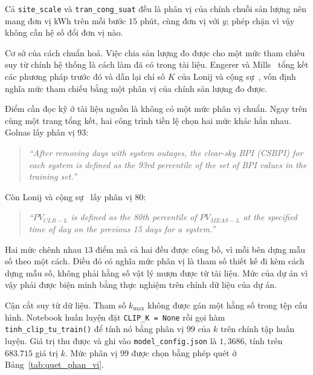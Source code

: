 \documentclass[12pt, a4paper]{report}
\begin{document}
Cả \texttt{site\_scale} và \texttt{tran\_cong\_suat} đều là phân vị của chính chuỗi sản lượng nên
mang đơn vị kWh trên mỗi bước $15$ phút, cùng đơn vị với $y$; phép chặn vì vậy không cần hệ số
đổi đơn vị nào.

Cơ sở của cách chuẩn hoá. Việc chia sản lượng đo được cho một mức tham chiếu suy từ
chính hệ thống là cách làm đã có trong tài liệu. Engerer và Mills~\cite{engerer2014kpv} tổng
kết các phương pháp trước đó và dẫn lại chỉ số $K$ của Lonij và cộng sự~\cite{lonij2012tucson},
vốn định nghĩa mức tham chiếu bằng một phân vị của chính sản lượng đo được.

Điểm cần đọc kỹ ở tài liệu nguồn là không có một mức phân vị chuẩn. Ngay trên cùng
một trang tổng kết, hai công trình tiền lệ chọn hai mức khác hẳn nhau. Golnas lấy
phân vị $93$:

\begin{quote}\small
\textit{``After removing days with system outages, the clear-sky BPI (CSBPI) for each system is defined as the 93rd percentile of the set of BPI values in the training set.''}
\end{quote}

Còn Lonij và cộng sự~\cite{lonij2012tucson} lấy phân vị $80$:

\begin{quote}\small
\textit{``$PV_{CLR-L}$ is defined as the 80th percentile of $PV_{MEAS-L}$ at the specified time of day on the previous 15 days for a system.''}
\end{quote}


Hai mức chênh nhau $13$ điểm mà cả hai đều được công bố, vì mỗi bên dựng mẫu số theo một cách.
Điều đó có nghĩa mức phân vị là tham số thiết kế đi kèm cách dựng mẫu số, không phải
hằng số vật lý mượn được từ tài liệu. Mức của dự án vì vậy phải được biện minh bằng thực
nghiệm trên chính dữ liệu của dự án.

Cận cắt suy từ dữ liệu. Tham số $k_{\max}$ không được gán một hằng số
trong tệp cấu hình. Notebook huấn luyện đặt \texttt{CLIP\_K = None} rồi gọi hàm
\texttt{tinh\_clip\_tu\_train()} để tính nó bằng phân vị $99$ của $k$ trên chính tập huấn luyện.
Giá trị thu được và ghi vào \texttt{model\_config.json} là $1{,}3686$, tính trên
$683.715$ giá trị $k$. Mức phân vị $99$ được chọn bằng phép quét ở
Bảng~\ref{tab:quet_phan_vi}.
\end{document}
